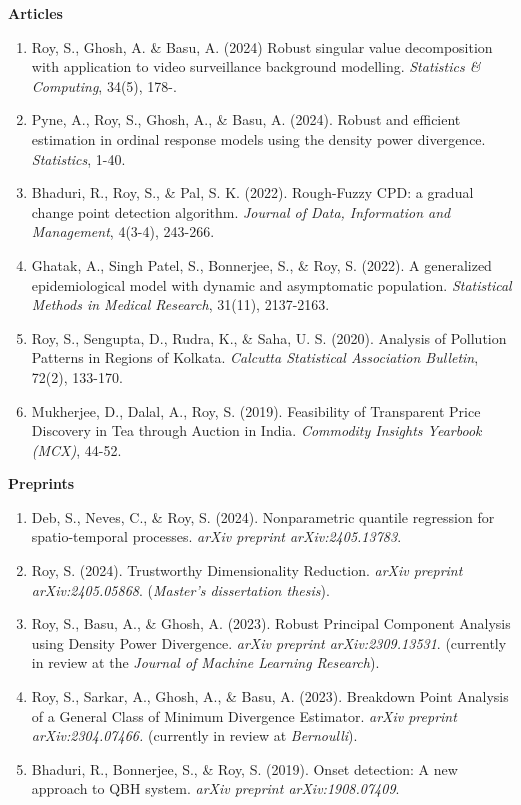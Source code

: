 \documentclass[9pt]{developercv} %
\begin{document}
\begin{minipage}{\textwidth}
    \small
    \textbf{Articles}
    \begin{enumerate}
        \item Roy, S., Ghosh, A. \& Basu, A. (2024) Robust singular value decomposition with application to video surveillance background modelling. \textit{Statistics \& Computing}, 34(5), 178-.
        \item Pyne, A., Roy, S., Ghosh, A., \& Basu, A. (2024). Robust and efficient estimation in ordinal response models using the density power divergence. \textit{Statistics}, 1-40.
        \item Bhaduri, R., Roy, S., \& Pal, S. K. (2022). Rough-Fuzzy CPD: a gradual change point detection algorithm. \textit{Journal of Data, Information and Management}, 4(3-4), 243-266.
        \item Ghatak, A., Singh Patel, S., Bonnerjee, S., \& Roy, S. (2022). A generalized epidemiological model with dynamic and asymptomatic population. \textit{Statistical Methods in Medical Research}, 31(11), 2137-2163.
        \item Roy, S., Sengupta, D., Rudra, K., \& Saha, U. S. (2020). Analysis of Pollution Patterns in Regions of Kolkata. \textit{Calcutta Statistical Association Bulletin}, 72(2), 133-170.
        \item Mukherjee, D., Dalal, A., Roy, S. (2019). Feasibility of Transparent Price Discovery in Tea through Auction in India. \textit{Commodity Insights Yearbook (MCX)}, 44-52.
    \end{enumerate}

    \vspace*{0.3cm}
    \textbf{Preprints}
    \begin{enumerate}
        \item Deb, S., Neves, C., \& Roy, S. (2024). Nonparametric quantile regression for spatio-temporal processes. \textit{arXiv preprint arXiv:2405.13783}.
        \item Roy, S. (2024). Trustworthy Dimensionality Reduction. \textit{arXiv preprint arXiv:2405.05868}. (\textit{Master's dissertation thesis}).
        \item Roy, S., Basu, A., \& Ghosh, A. (2023). Robust Principal Component Analysis using Density Power Divergence. \textit{arXiv preprint arXiv:2309.13531}. (currently in review at the \textit{Journal of Machine Learning Research}).
        \item Roy, S., Sarkar, A., Ghosh, A., \& Basu, A. (2023). Breakdown Point Analysis of a General Class of Minimum Divergence Estimator. \textit{arXiv preprint arXiv:2304.07466.} (currently in review at \textit{Bernoulli}).
        \item Bhaduri, R., Bonnerjee, S., \& Roy, S. (2019). Onset detection: A new approach to QBH system. \textit{arXiv preprint arXiv:1908.07409}.
    \end{enumerate}
\end{minipage}
\end{document}
